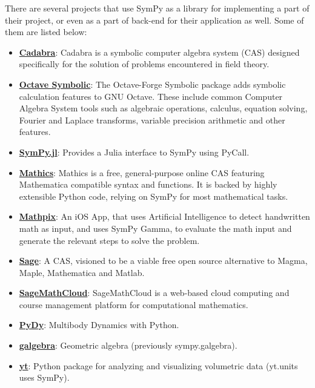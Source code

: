 There are several projects that use SymPy as a library for implementing
a part of their project, or even as a part of back-end for their
application as well.
\newline
Some of them are listed below:

\begin{itemize}
\item
  \href{http://cadabra.science/index.html}{\textbf{Cadabra}}: Cadabra is
  a symbolic computer algebra system (CAS) designed specifically for the
  solution of problems encountered in field theory.
\item
  \href{http://octave.sourceforge.net/symbolic/}{\textbf{Octave Symbolic}}:
  The Octave-Forge Symbolic package adds symbolic calculation features
  to GNU Octave. These include common Computer Algebra System tools such
  as algebraic operations, calculus, equation solving, Fourier and
  Laplace transforms, variable precision arithmetic and other features.
\item
  \href{https://github.com/jverzani/SymPy.jl}{\textbf{SymPy.jl}}:
  Provides a Julia interface to SymPy using PyCall.
\item
  \href{https://mathics.github.io/}{\textbf{Mathics}}: Mathics is a
  free, general-purpose online CAS featuring Mathematica compatible
  syntax and functions. It is backed by highly extensible Python code,
  relying on SymPy for most mathematical tasks.
\item
  \href{http://mathpix.com/}{\textbf{Mathpix}}: An iOS App, that uses
  Artificial Intelligence to detect handwritten math as input, and uses
  SymPy Gamma, to evaluate the math input and generate the relevant
  steps to solve the problem.
\item
  \href{http://www.sagemath.org/}{\textbf{Sage}}: A CAS, visioned to be
  a viable free open source alternative to Magma, Maple, Mathematica and
  Matlab.
\item
  \href{https://cloud.sagemath.com}{\textbf{SageMathCloud}}:
  SageMathCloud is a web-based cloud computing and course management
  platform for computational mathematics.
\item
  \href{http://www.pydy.org/}{\textbf{PyDy}}: Multibody Dynamics with
  Python.
\item
  \href{https://github.com/brombo/galgebra}{\textbf{galgebra}}:
  Geometric algebra (previously sympy.galgebra).
\item
  \href{http://yt-project.org/}{\textbf{yt}}: Python package for
  analyzing and visualizing volumetric data (yt.units uses SymPy).

\end{itemize}
